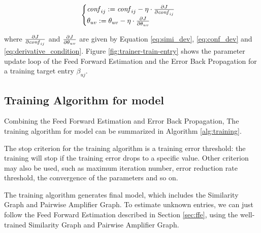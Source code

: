 \begin{equation}
  \label{eq:gradient descent}
  \begin{cases}
    \confi{ij} := \confi{ij}-\eta \cdot \pa{J}{\confi{ij}}\\
    \theta_{uv} := \theta_{uv} -\eta \cdot \pa{J}{\theta_{uv}}
  \end{cases}
\end{equation}

\noindent where $\frac{\partial {J}}{\partial {\mathit{conf}_{ij}}}$ and $\frac{\partial {J}}{\partial {\theta_{uv}}}$ are
given by Equation \ref{eq:simi_dev}, \ref{eq:conf_dev} and
\ref{eq:derivative_condition}. Figure \ref{fig:trainer-train-entry}
shows the parameter update loop of the Feed Forward Estimation and the
Error Back Propagation for a training target entry $\beta_{uj}$.

\subsection{Training Algorithm for {\sppan} model}
Combining the Feed Forward Estimation and Error Back Propagation, The
training algorithm for {\sppan} model can be summarized in Algorithm
\ref{alg:training}.

The stop criterion for the training algorithm is a training error
threshold: the training will stop if the training error drops to a
specific value. Other criterion may also be used, such as maximum
iteration number\cite{?}, error reduction rate threshold\cite{?}, the
convergence of the parameters\cite{?} and so on.

The training algorithm generates final {\sppan} model, which includes
the Similarity Graph and Pairwise Amplifier Graph. To estimate unknown
entries, we can just follow the Feed Forward Estimation described in
Section \ref{sec:ffe}, using the well-trained Similarity Graph and
Pairwise Amplifier Graph.



